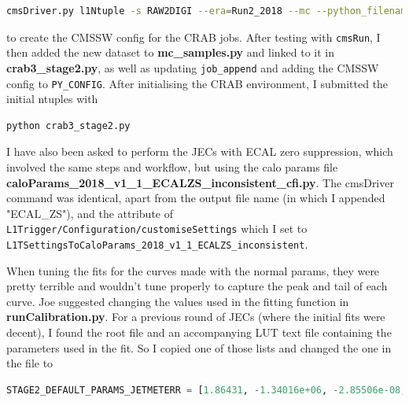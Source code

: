 \begin{lstlisting}[belowskip=-0.7cm, language=sh, numbers=none]
cmsDriver.py l1Ntuple -s RAW2DIGI --era=Run2_2018 --mc --python_filename=l1NtupleMcMaker2018_RAW2DIGI_v1.py --no_output -n 202 --conditions=100X_upgrade2018_realistic_v11 --customise=L1Trigger/Configuration/customiseReEmul.L1TReEmulMCFromRAWSimHcalTP --customise=L1Trigger/L1TNtuples/customiseL1Ntuple.L1NtupleRAWEMUGEN_MC --customise=L1Trigger/Configuration/customiseSettings.L1TSettingsToCaloParams_2018_v1_1_inconsistent --custom_conditions=HcalChannelQuality_2018_v3.0_mc,HcalChannelQualityRcd,frontier://FrontierProd/CMS_CONDITIONS --filein=/store/mc/RunIISpring18DR/QCD_Pt-15to3000_TuneCP5_Flat_13TeV_pythia8/GEN-SIM-RAW/NZSPU0to70_100X_upgrade2018_realistic_v10-v1/100000/00818B45-1522-E811-910B-1866DAEA7E64.root
\end{lstlisting}

to create the CMSSW config for the CRAB jobs. After testing with \texttt{cmsRun}, I then added the new dataset to \textbf{mc\_samples.py} and linked to it in \textbf{crab3\_stage2.py}, as well as updating \texttt{job\_append} and adding the CMSSW config to \texttt{PY\_CONFIG}. After initialising the CRAB environment, I submitted the initial ntuples with

\begin{lstlisting}[belowskip=-0.7cm, language=sh, numbers=none]
python crab3_stage2.py
\end{lstlisting}

I have also been asked to perform the JECs with ECAL zero suppression, which involved the same steps and workflow, but using the calo params file \textbf{caloParams\_2018\_v1\_1\_ECALZS\_inconsistent\_cfi.py}. The cmsDriver command was identical, apart from the output file name (in which I appended "ECAL\_ZS"), and the attribute of \texttt{L1Trigger/Configuration/customiseSettings} which I set to \texttt{L1TSettingsToCaloParams\_2018\_v1\_1\_ECALZS\_inconsistent}.

When tuning the fits for the curves made with the normal params, they were pretty terrible and wouldn't tune properly to capture the peak and tail of each curve. Joe suggested changing the values used in the fitting function in \textbf{runCalibration.py}. For a previous round of JECs (where the initial fits were decent), I found the root file and an accompanying LUT text file containing the parameters used in the fit. So I copied one of those lists and changed the one in the file to

\begin{lstlisting}[belowskip=-0.7cm, language=Python, numbers=none]
STAGE2_DEFAULT_PARAMS_JETMETERR = [1.86431, -1.34016e+06, -2.85506e-08, 20.2633, -6.40935e-07, -1.54, 1.06511]
\end{lstlisting}

